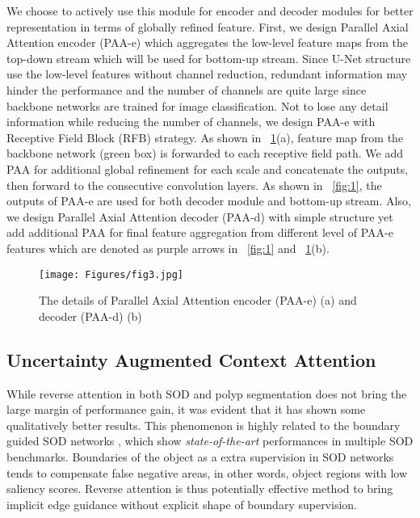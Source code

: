 \documentclass[sigconf]{acmart}
\begin{document}
We choose to actively use this module for encoder and decoder modules for better representation in terms of globally refined feature. First, we design  Parallel Axial Attention encoder (PAA-e) which aggregates the low-level feature maps from the top-down stream which will be used for bottom-up stream. Since U-Net structure use the low-level features without channel reduction, redundant information may hinder the performance and the number of channels are quite large since backbone networks are trained for image classification. Not to lose any detail information while reducing the number of channels, we design PAA-e with Receptive Field Block (RFB) \cite{liu2018receptive} strategy. As shown in \figureautorefname~\ref{fig:3}(a), feature map from the backbone network (green box) is forwarded to each receptive field path. We add PAA for additional global refinement for each scale and concatenate the outputs, then forward to the consecutive convolution layers. As shown in \figureautorefname~\ref{fig:1}, the outputs of PAA-e are used for both decoder module and bottom-up stream. Also, we design Parallel Axial Attention decoder (PAA-d) with simple structure yet add additional PAA for final feature aggregation from different level of PAA-e features which are denoted as purple arrows in \figureautorefname~\ref{fig:1} and \figureautorefname~\ref{fig:3}(b). 


\begin{figure}[]
  \centering
  \texttt{[image: Figures/fig3.jpg]}
  \caption{The details of Parallel Axial Attention encoder (PAA-e) (a) and decoder (PAA-d) (b)}
  \label{fig:3}
\end{figure}

\subsection{Uncertainty Augmented Context Attention}

\label{subsec:3}

While reverse attention \cite{chen2018reverse} in both SOD and polyp segmentation does not bring the large margin of performance gain, it was evident that it has shown some qualitatively better results. This phenomenon is highly related to the boundary guided SOD networks \cite{yang2017edge, su2019selectivity},  which show \textit{state-of-the-art} performances in multiple SOD benchmarks. Boundaries of the object as a extra supervision in SOD networks tends to compensate false negative areas, in other words, object regions with low saliency scores. Reverse attention is thus potentially effective method to bring implicit edge guidance without explicit shape of boundary supervision.
\end{document}
